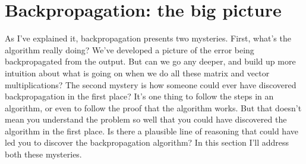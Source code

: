 \documentclass[a4paper,twoside,10pt]{book}
\begin{document}
\section{Backpropagation: the big picture}
\label{sec:2.9}
As I've explained it, backpropagation presents two mysteries. First, what's the algorithm really doing? We've developed a picture of the error being backpropagated from the output. But can we go any deeper, and build up more intuition about what is going on when we do all these matrix and vector multiplications? The second mystery is how someone could ever have discovered backpropagation in the first place? It's one thing to follow the steps in an algorithm, or even to follow the proof that the algorithm works. But that doesn't mean you understand the problem so well that you could have discovered the algorithm in the first place. Is there a plausible line of reasoning that could have led you to discover the backpropagation algorithm? In this section I'll address both these mysteries.
\end{document}

